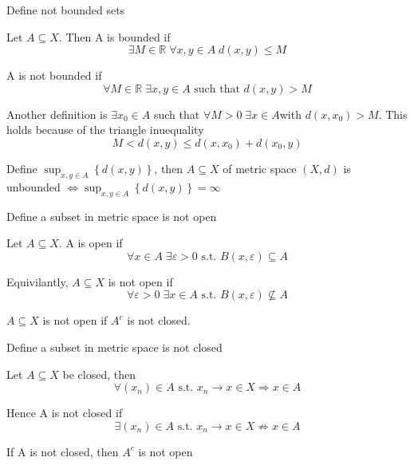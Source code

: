 \documentclass[a4paper,norsk]{article}
\renewcommand{\leq}{\leqslant}
\renewcommand{\epsilon}{\varepsilon}
\begin{document}
\begin{oppgavebox}{Define not bounded sets}{}
\begin{proofbox}{}{}
  Let $ A \subseteq X $. Then A is bounded if 
\[
    \exists M \in \mathbb{R} \; \forall x, y \in A \; d \left( x, y \right) \leq M
\]

A is not bounded if
\[
    \forall M \in \mathbb{R} \; \exists x, y \in A \text{ such that } d \left( x, y \right) > M
\]
\end{proofbox}
 
\begin{proofbox}{}{}
  Another definition is
  $ \exists x_0 \in A $ such that $ \forall M > 0 \; \exists x \in A $with $ d \left( x, x_0 \right) > M $. This holds because of the triangle inuequality
  \[
      M < d \left( x, y \right) \leq d \left( x, x_0 \right) + d \left( x_0, y \right) 
  \]
\end{proofbox}

\begin{proofbox}{}{}
  Define $ \sup_{x, y \in A} \left\{ d \left( x, y \right)  \right\}  $, then $ A \subseteq X $ of metric space $ \left( X, d \right)$ is unbounded $ \iff  \sup_{x, y \in A} \left\{ d \left( x, y \right)  \right\} = \infty $ 
\end{proofbox}

\end{oppgavebox}

\begin{oppgavebox}{Define a subset in metric space is not open}{}
\begin{proofbox}{}{}
  Let $ A \subseteq X $. A is open if
  \[
      \forall x \in A \; \exists \epsilon > 0 \text{ s.t. } B \left( x, \epsilon \right) \subseteq A 
  \]

  Equivilantly, $ A \subseteq X $ is not open if
  \[
      \forall \epsilon > 0 \; \exists x \in A \text{ s.t. } B \left( x, \epsilon   \right) \not\subseteq A 
  \]
\end{proofbox}

\begin{proofbox}{}{}
  $ A \subseteq X $ is not open if $ A^c $ is not closed.
\end{proofbox}
\end{oppgavebox}

\begin{oppgavebox}{Define a subset in metric space is not closed}{}
\begin{proofbox}{}{}
  Let $ A \subseteq X $ be closed, then 
  \[
      \forall \left( x_n \right) \in A \text{ s.t. } x_n \to x \in X \Rightarrow x \in A
  \]  


  Hence A is not closed if
  \[
      \exists \left( x_n \right) \in A \text{ s.t. } x_n \to x \in X \not \Rightarrow x \in A
  \]
  
\end{proofbox}

\begin{proofbox}{}{}
  If A is not closed, then $ A^c $ is not open
\end{proofbox}
\end{oppgavebox}
\end{document}
